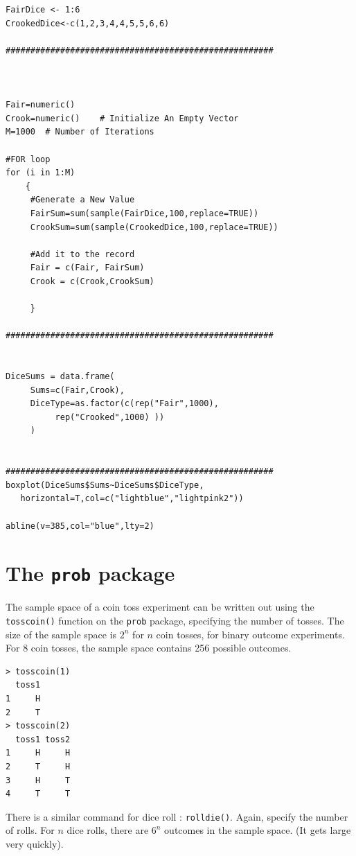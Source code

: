 \documentclass[11pt]{article} %
\begin{document}
\newpage
\begin{framed}
\begin{verbatim}
FairDice <- 1:6
CrookedDice<-c(1,2,3,4,4,5,5,6,6)

######################################################



Fair=numeric()
Crook=numeric()    # Initialize An Empty Vector
M=1000  # Number of Iterations

#FOR loop 
for (i in 1:M)
    {
     #Generate a New Value
     FairSum=sum(sample(FairDice,100,replace=TRUE))
     CrookSum=sum(sample(CrookedDice,100,replace=TRUE))
     
     #Add it to the record
     Fair = c(Fair, FairSum)
     Crook = c(Crook,CrookSum)

     }

######################################################


DiceSums = data.frame(
     Sums=c(Fair,Crook),
     DiceType=as.factor(c(rep("Fair",1000),
          rep("Crooked",1000) ))
     )


######################################################
boxplot(DiceSums$Sums~DiceSums$DiceType,
   horizontal=T,col=c("lightblue","lightpink2"))

abline(v=385,col="blue",lty=2)
\end{verbatim}
\end{framed}
\newpage
\section{The \texttt{prob} package}

The sample space of a coin toss experiment can be written out using the \texttt{tosscoin()} function on the \texttt{prob} package, specifying the number of tosses. The size of the sample space is $2^n$ for $n$ coin tosses, for binary outcome experiments. For 8 coin tosses, the sample space contains 256 possible outcomes.

\begin{verbatim}
> tosscoin(1)
  toss1
1     H
2     T
> tosscoin(2)
  toss1 toss2
1     H     H
2     T     H
3     H     T
4     T     T
\end{verbatim}
There is a similar command for dice roll : \texttt{rolldie()}. Again, specify the number of rolls. For $n$ dice rolls, there are $6^n$ outcomes in the sample space. (It gets large very quickly).
\end{document}
